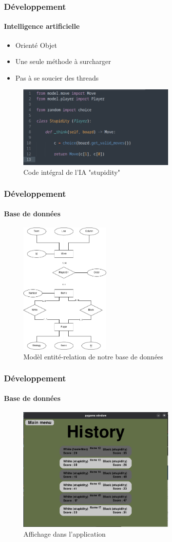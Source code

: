 \begin{frame}
	\frametitle{Développement}
	\framesubtitle{Intelligence artificielle}

	\begin{itemize}
		\item Orienté Objet
		\item Une seule méthode à surcharger
		\item Pas à se soucier des threads
	\end{itemize}

	\begin{figure}[b]
		\includegraphics[width=0.7\textwidth]{img/stupidity.png}
		\caption{Code intégral de l'IA "stupidity"}
	\end{figure}
\end{frame}

\begin{frame}
	\frametitle{Développement}
	\framesubtitle{Base de données}

	\begin{figure}
		\includegraphics[width=0.4\textwidth]{img/entity_relationship.png}
		\caption{Modèl entité-relation de notre base de données}
	\end{figure}
\end{frame}

\begin{frame}
	\frametitle{Développement}
	\framesubtitle{Base de données}
	\begin{figure}
		\includegraphics[width=0.7\textwidth]{img/history.png}
		\caption{Affichage dans l'application}
	\end{figure}
\end{frame}